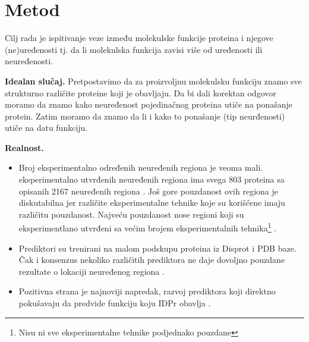 \section {Metod}

Cilj rada je ispitivanje veze između molekulske funkcije proteina i njegove
(ne)uređenosti tj. da li molekulska funkcija zavisi više od uređenosti ili
neuređenosti.

\textbf{Idealan slučaj.} 
Pretpostavimo da za proizvoljnu molekulsku funkciju znamo sve strukturno različite
proteine koji je obavljaju.  Da bi dali korektan odgovor  moramo da znamo kako
neuređenost pojedinačnog proteina utiče na ponašanje protein.  Zatim moramo da
znamo da li i kako to ponašanje (tip neurđenosti) utiče na datu funkciju.

\textbf{Realnost.} 
\begin{itemize}
  \item Broj eksperimentalno određenih neuređenih regiona je veoma mali.
     eksperimentalno utvrđenih neuređenih regiona ima
    svega 803 proteina sa opisanih 2167 neuređenih regiona \parencite{disprot7}.
    Još gore pouzdanost ovih regiona je diskutabilna jer različite
    eksperimentalne tehnike koje su korišćene imaju različitu pouzdanost.
    Najveću pouzdanost nose regioni koji su eksperimentlano utvrđeni sa 
    većim brojem eksperimentalnih tehnika\footnote{Nisu ni sve eksperimentalne
    tehnike podjednako pouzdane} \parencite{disprot7}. 
  \item Prediktori su trenirani na malom podskupu proteina iz Disprot i PDB  baze.
    Čak i konsenzus nekoliko različitih prediktora ne daje dovoljno pouzdane
    rezultate o lokaciji neuređenog regiona \parencite{Mitic}.
  \item 
    Pozitivna strana je najnoviji napredak, razvoj prediktora koji direktno
    pokušavaju da predvide funkciju koju IDPr obavlja \parencite{meng_c20017}.

\end{itemize}

